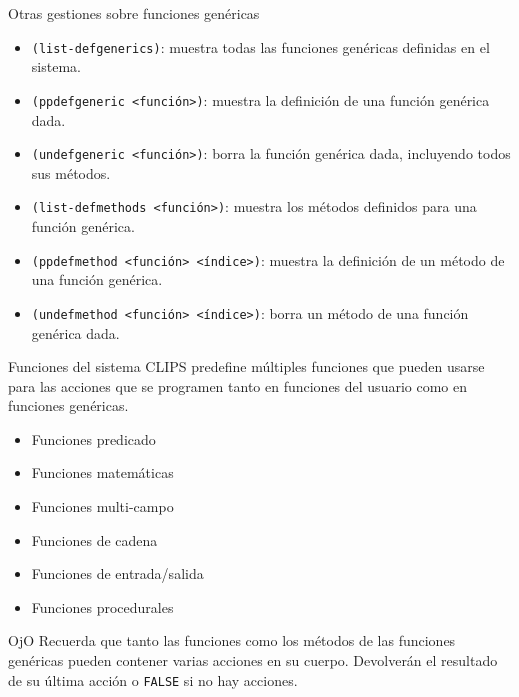 \documentclass[usenames,dvipsnames,aspectratio=169]{beamer}
\begin{document}
\begin{frame}{Otras gestiones sobre funciones genéricas}
	\begin{itemize}
		\item \texttt{(list-defgenerics)}: muestra todas las funciones genéricas definidas en el sistema.
		\item \texttt{(ppdefgeneric <función>)}: muestra la definición de una función genérica dada.
		\item \texttt{(undefgeneric <función>)}: borra la función genérica dada, incluyendo todos sus métodos.
		\item \texttt{(list-defmethods <función>)}: muestra los métodos definidos para una función genérica.
		\item \texttt{(ppdefmethod <función> <índice>)}: muestra la definición de un método de una función genérica.
		\item \texttt{(undefmethod <función> <índice>)}: borra un método de una función genérica dada.
	\end{itemize}
\end{frame}

\begin{frame}{Funciones del sistema}
	CLIPS predefine múltiples funciones que pueden usarse para las acciones que se programen tanto en funciones del usuario como en funciones genéricas.\\[.5cm]
	
	\begin{minipage}{.35\linewidth}
		\begin{itemize}
			\item Funciones predicado
			\item Funciones matemáticas
			\item Funciones multi-campo
			\item Funciones de cadena
			\item Funciones de entrada/salida
			\item Funciones procedurales
		\end{itemize}
	\end{minipage}
	\hfill
	\begin{minipage}{.55\linewidth}
		\begin{block}{OjO}
			Recuerda que tanto las funciones como los métodos de las funciones genéricas pueden contener varias acciones en su cuerpo. Devolverán el resultado de su última acción o \texttt{FALSE} si no hay acciones.
		\end{block}
	\end{minipage}
\end{frame}
\end{document}
